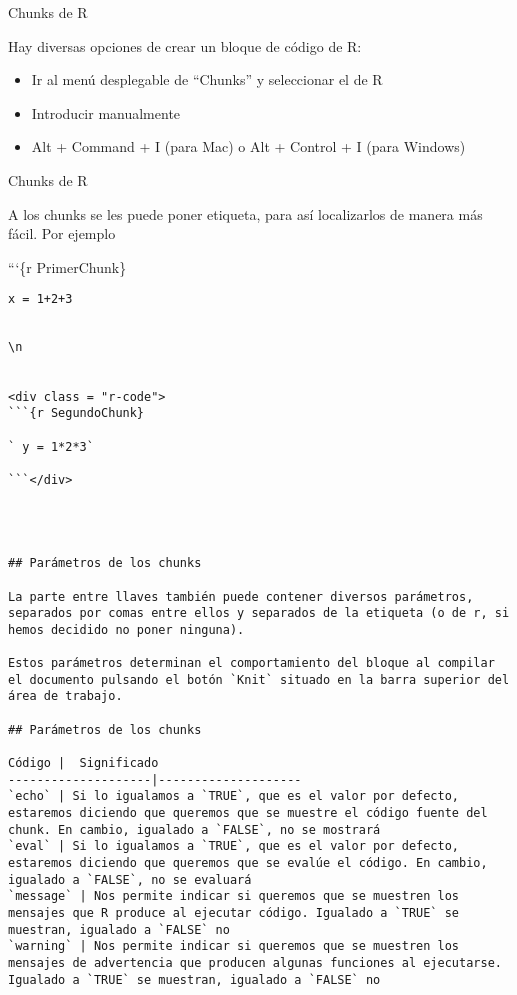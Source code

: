 \documentclass[
  ignorenonframetext,
]{beamer}
\providecommand{\tightlist}{%
  \setlength{\itemsep}{0pt}\setlength{\parskip}{0pt}}
\begin{document}
\begin{frame}{Chunks de R}
\protect\hypertarget{chunks-de-r-1}{}

Hay diversas opciones de crear un bloque de código de R:

\begin{itemize}
\tightlist
\item
  Ir al menú desplegable de ``Chunks'' y seleccionar el de R
\item
  Introducir manualmente
\item
  Alt + Command + I (para Mac) o Alt + Control + I (para Windows)
\end{itemize}

\end{frame}

\begin{frame}[fragile]{Chunks de R}
\protect\hypertarget{chunks-de-r-2}{}

A los chunks se les puede poner etiqueta, para así localizarlos de
manera más fácil. Por ejemplo

```\{r PrimerChunk\}

\texttt{x\ =\ 1+2+3}

\begin{verbatim}

\n


<div class = "r-code">
```{r SegundoChunk}

` y = 1*2*3`

```</div>




## Parámetros de los chunks

La parte entre llaves también puede contener diversos parámetros, separados por comas entre ellos y separados de la etiqueta (o de r, si hemos decidido no poner ninguna).

Estos parámetros determinan el comportamiento del bloque al compilar el documento pulsando el botón `Knit` situado en la barra superior del área de trabajo.

## Parámetros de los chunks

Código |  Significado                                  
--------------------|--------------------
`echo` | Si lo igualamos a `TRUE`, que es el valor por defecto, estaremos diciendo que queremos que se muestre el código fuente del chunk. En cambio, igualado a `FALSE`, no se mostrará
`eval` | Si lo igualamos a `TRUE`, que es el valor por defecto, estaremos diciendo que queremos que se evalúe el código. En cambio, igualado a `FALSE`, no se evaluará
`message` | Nos permite indicar si queremos que se muestren los mensajes que R produce al ejecutar código. Igualado a `TRUE` se muestran, igualado a `FALSE` no
`warning` | Nos permite indicar si queremos que se muestren los mensajes de advertencia que producen algunas funciones al ejecutarse. Igualado a `TRUE` se muestran, igualado a `FALSE` no


\end{verbatim}
\end{frame}
\end{document}
